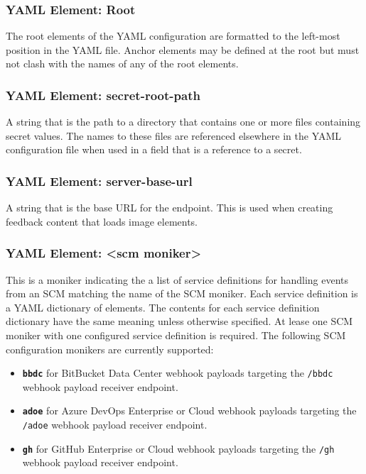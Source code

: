 \subsubsection{YAML Element: Root}\label{sec:yaml-root}

The root elements of the YAML configuration are formatted to the left-most
position in the YAML file.  Anchor elements may be defined at the root but
must not clash with the names of any of the root elements.

\subsubsection{YAML Element: secret-root-path}\label{sec:yaml-secret-root-path}

A string that is the path to a directory that contains one or more files containing secret values.  The names to these files are 
referenced elsewhere in the YAML configuration file when used in a field that is a reference to a secret.

\subsubsection{YAML Element: server-base-url}\label{sec:yaml-server-base-url}
A string that is the base URL for the \cxoneflow endpoint.  This is used when creating feedback content that loads image elements.

\subsubsection{YAML Element: <scm moniker>}\label{sec:yaml-scm-monikers}

This is a moniker indicating the a list of service definitions for handling events from an SCM matching the name of the SCM
moniker.  Each service definition is a YAML dictionary of elements. The contents for each service definition dictionary 
have the same meaning unless otherwise specified.  At lease one SCM moniker with one configured service definition is required. 
The following SCM configuration monikers are currently supported:

\begin{itemize}
    \item \textbf{\texttt{bbdc}} for BitBucket Data Center webhook payloads targeting the \texttt{/bbdc}
    webhook payload receiver endpoint.
    \item \textbf{\texttt{adoe}} for Azure DevOps Enterprise or Cloud webhook payloads targeting the \texttt{/adoe}
    webhook payload receiver endpoint.
    \item \textbf{\texttt{gh}} for GitHub Enterprise or Cloud webhook payloads targeting the \texttt{/gh}
    webhook payload receiver endpoint.
\end{itemize}

